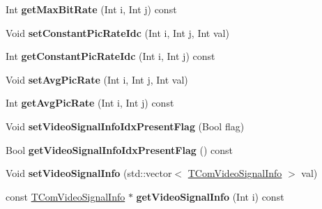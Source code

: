 \begin{DoxyCompactItemize}
\item 
\mbox{\label{class_t_com_v_p_s_v_u_i_af74b69c8d2fbb6837ecfedd8ce80962c}} 
Int {\bfseries get\+Max\+Bit\+Rate} (Int i, Int j) const
\item 
\mbox{\label{class_t_com_v_p_s_v_u_i_aa4d2a98d62ef5a34a85c60bfe7d4f899}} 
Void {\bfseries set\+Constant\+Pic\+Rate\+Idc} (Int i, Int j, Int val)
\item 
\mbox{\label{class_t_com_v_p_s_v_u_i_a8f3c8a935edde22f3dc85e88600540d6}} 
Int {\bfseries get\+Constant\+Pic\+Rate\+Idc} (Int i, Int j) const
\item 
\mbox{\label{class_t_com_v_p_s_v_u_i_a0553131a609d1237583fcada5601e19c}} 
Void {\bfseries set\+Avg\+Pic\+Rate} (Int i, Int j, Int val)
\item 
\mbox{\label{class_t_com_v_p_s_v_u_i_a1730f7e50cfe8aad847e26da0c68772c}} 
Int {\bfseries get\+Avg\+Pic\+Rate} (Int i, Int j) const
\item 
\mbox{\label{class_t_com_v_p_s_v_u_i_a6e9b499e77fe43fd62e9765b452832d1}} 
Void {\bfseries set\+Video\+Signal\+Info\+Idx\+Present\+Flag} (Bool flag)
\item 
\mbox{\label{class_t_com_v_p_s_v_u_i_ae16f7697b0bbc99cf78964187a9e859c}} 
Bool {\bfseries get\+Video\+Signal\+Info\+Idx\+Present\+Flag} () const
\item 
\mbox{\label{class_t_com_v_p_s_v_u_i_a35377ec525c4f52d35a6b411b8773db7}} 
Void {\bfseries set\+Video\+Signal\+Info} (std\+::vector$<$ \hyperlink{class_t_com_video_signal_info}{T\+Com\+Video\+Signal\+Info} $>$ val)
\item 
\mbox{\label{class_t_com_v_p_s_v_u_i_ac8001677f67349b9455ac5e4a24eb792}} 
const \hyperlink{class_t_com_video_signal_info}{T\+Com\+Video\+Signal\+Info} $\ast$ {\bfseries get\+Video\+Signal\+Info} (Int i) const
\item 
\mbox{\label{class_t_com_v_p_s_v_u_i_a44916f4365473cb5be1ae930685479c1}} 

\end{DoxyCompactItemize}
